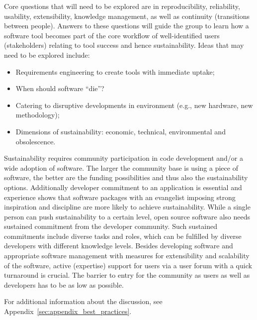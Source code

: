Core questions that will need to be explored are in reproducibility, 
reliability,  usability, extensibility, knowledge management, as well as continuity
(transitions between people). Answers to these questions will guide the group
to learn how a software
tool becomes part of the core workflow of well-identified users (stakeholders)
relating to tool success and hence sustainability.
Ideas  that may need to be explored include:
\begin{itemize}
\item Requirements engineering to create tools with immediate uptake;
\item When should software ``die''?
\item Catering to disruptive developments in environment (e.g., new hardware,
new methodology);
\item Dimensions of sustainability: economic, technical, environmental and
obsolescence. 
\end{itemize}

Sustainability requires community participation in code development and/or a
wide adoption of software. The larger the community base is using a piece of
software, the better are the funding possibilities and thus also the
sustainability options. Additionally developer commitment to an application is
essential and experience shows that software packages with an evangelist
imposing strong inspiration and discipline are more likely to achieve
sustainability. While a single person can push sustainability to a certain
level, open source software also needs sustained commitment from the developer
community. Such sustained commitments include diverse tasks and roles, which can
be fulfilled by diverse developers with different knowledge levels. Besides
developing software and appropriate software management with measures for
extensibility and scalability of the software, active (expertise) support for
users via a user forum with a quick turnaround is crucial. The barrier to entry
for the community as users as well as developers has to be as low as possible.

For additional information about the discussion, see
Appendix~\ref{sec:appendix_best_practices}.

